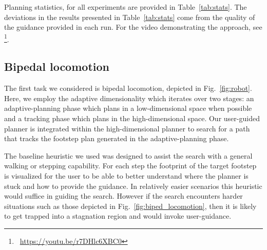 \documentclass{article}
\begin{document}
Planning statistics,  for all experiments are provided in Table~\ref{tab:stats}.
The deviations in the results presented in Table~\ref{tab:stats} come from the quality of the guidance provided in each run.
For the video demonstrating the approach, see \footnote{\small{~\url{https://youtu.be/r7DHlc6XBC0}}}.


\subsection{Bipedal locomotion}
\label{subsec:locomotion}




The first task we considered is bipedal locomotion, depicted in Fig.~\ref{fig:robot}.
Here, we employ the adaptive dimensionality 
which iterates over two stages: an adaptive-planning phase which plans in a low-dimensional space when possible and a tracking phase which plans in the high-dimensional space.
Our user-guided planner is integrated within the high-dimensional planner to search for a path that tracks the footstep plan generated in the adaptive-planning  phase. 

The baseline heuristic we used was designed to assist the search with a general walking or stepping capability. For each step the footprint of the target footstep is visualized for the user to be able to better understand where the planner is stuck and how to provide the guidance. In relatively easier scenarios this heuristic would suffice in guiding the search. However if the search encounters harder situations such as those depicted in Fig.~\ref{fig:biped_locomotion}, then it is likely to get trapped into a stagnation region and would invoke user-guidance.
\end{document}
